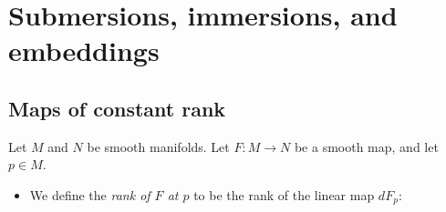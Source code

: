 
\chapter{Submersions, immersions, and embeddings}

\section{Maps of constant rank}

\begin{definition}
    Let $M$ and $N$ be smooth manifolds. Let $F : M \to N$ be a smooth map, and let $p \in M$.
    \begin{itemize}
        \item We define the \emph{rank of $F$ at $p$} to be the rank of the linear map $dF_p :$
    \end{itemize}
\end{definition}
